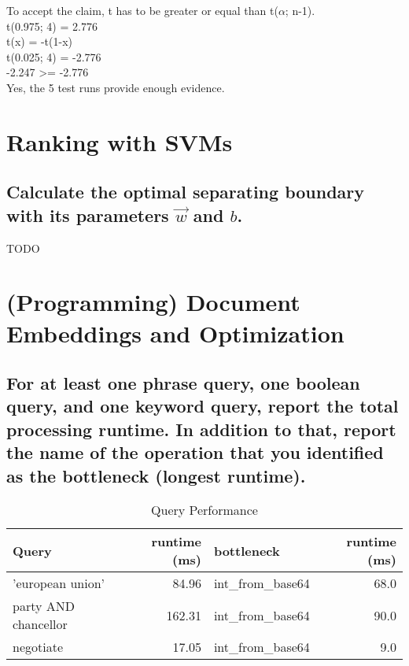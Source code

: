 \documentclass{scrartcl}
\begin{document}
To accept the claim, t has to be greater or equal than t($\alpha$; n-1).\\

t(0.975; 4) = 2.776\\
t(x) = -t(1-x)\\
t(0.025; 4) = -2.776\\

-2.247 >= -2.776\\

Yes, the 5 test runs provide enough evidence.


\section{Ranking with SVMs}

\subsection{Calculate the optimal separating boundary with its parameters $\vec{w}$ and $b$.}

TODO


\section{(Programming) Document Embeddings and Optimization}

\subsection{For at least one phrase query, one boolean query, and one keyword query, report the total processing runtime. In addition to that, report the name of the operation that you identified as the bottleneck (longest runtime).}

\begin{table}[h]
	\centering
	\caption{Query Performance}
	\begin{tabular}{l|r|l|r}
		Query                & runtime (ms) & bottleneck         & runtime (ms)  \\ \hline
		'european union'     &        84.96 & int\_from\_base64  & 68.0  \\
		party AND chancellor &       162.31 & int\_from\_base64  & 90.0  \\
		negotiate            &        17.05 & int\_from\_base64  &  9.0  \\
	\end{tabular}
\end{table}
\end{document}

